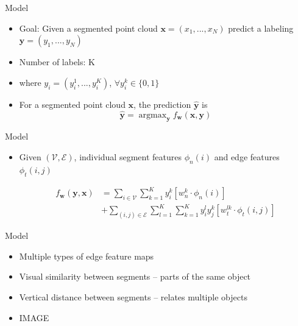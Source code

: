 \documentclass{beamer}
\DeclareMathOperator*{\argmax}{argmax}
\newcommand{\x}{{\mathbf x}}     %
\newcommand{\xs}[1]{{x_{#1}}}    %
\newcommand{\y}{{\mathbf y}}     %
\newcommand{\ys}[1]{{y_{#1}}}    %
\newcommand{\ysc}[2]{{y_{#1}^{#2}}}    %
\newcommand{\fn}[1]{{\phi_n(#1)}}      %
\newcommand{\fe}[3]{{\phi_{#1}(#2,#3)}}%
\newcommand{\w}{{\mathbf w}}           %
\newcommand{\wn}[1]{{w_n^{#1}}}        %
\newcommand{\we}[3]{{w_{#1}^{#2#3}}}   %
\newcommand{\df}[3]{{f_{#3}(#1,#2)}}   %
\begin{document}
\begin{frame}{Model}
\begin{itemize}


\item Goal: Given a segmented point cloud $\x=(\xs{1},...,\xs{N})$  predict a labeling $\y=(\ys{1},...,\ys{N})$
\item Number of labels: K
\item where $\ys{i}=(\ysc{i}{1},...,\ysc{i}{K})$,  $ \forall \ysc{i}{k} \in \{0,1\}$ 


\item For a segmented point cloud $\x$, the prediction $\hat{\y}$ is 
\begin{equation} \label{eq:argmax}
\hat{\y} = \argmax_\y \df{\x}{\y}{\w}
\end{equation}

\end{itemize}
\end{frame}


\begin{frame}{Model}
\begin{itemize}

\item Given $(\mathcal{V},\mathcal{E})$, individual segment features $\fn{i}$ and edge features $\fe{t}{i}{j}$

\begin{equation} \label{eq:model}
\begin{split}
\df{\y}{\x}{\w} & = \sum_{i \in \mathcal{V}} \sum_{k=1}^{K} \ysc{i}{k} \left[\wn{k} \cdot \fn{i} \right] \\
 & + \sum_{(i,j)\in \mathcal{E}}   \sum_{l=1}^{K}  \sum_{k=1}^{K} \ysc{i}{l} \ysc{j}{k}  \left[\we{t}{l}{k} \cdot \fe{t}{i}{j}\right] 
 \end{split}
\end{equation}

\end{itemize}
\end{frame}

\begin{frame}{Model}

\begin{itemize}

\item Multiple types of edge feature maps

\item Visual similarity between segments -- parts of the same object
\item Vertical distance between segments -- relates multiple objects
\item IMAGE

\end{itemize}
\end{frame}
\end{document}
